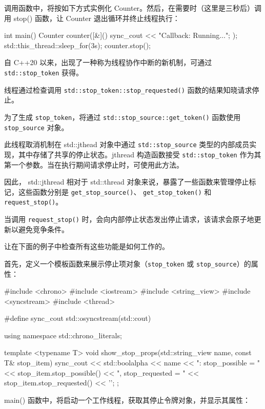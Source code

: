 调用函数中，将按如下方式实例化 Counter。然后，在需要时（这里是三秒后）调用 stop() 函数，让 Counter 退出循环并终止线程执行：

\begin{cpp}
int main() {
    Counter counter([&]() {
        sync_cout << "Callback: Running...\n";
    });
    std::this_thread::sleep_for(3s);
    counter.stop();
}
\end{cpp}

自 C++20 以来，出现了一种称为线程协作中断的新机制，可通过 \verb|std::stop_token| 获得。

线程通过检查调用 \verb|std::stop_token::stop_requested()| 函数的结果知晓请求停止。

为了生成 \verb|stop_token|，将通过 \verb|std::stop_source::get_token()| 函数使用 \verb|stop_source| 对象。

此线程取消机制在 std::jthead 对象中通过 \verb|std::stop_source| 类型的内部成员实现，其中存储了共享的停止状态。jthread 构造函数接受 \verb|std::stop_token| 作为其第一个参数。当在执行期间请求停止时，可使用此方法。

因此， std::jthread 相对于 std::thread 对象来说，暴露了一些函数来管理停止标记，这些函数分别是 \verb|get_stop_source()|、 \verb|get_stop_token()| 和 \verb|request_stop()|。

当调用 \verb|request_stop()| 时，会向内部停止状态发出停止请求，该请求会原子地更新以避免竞争条件。

让在下面的例子中检查所有这些功能是如何工作的。

首先，定义一个模板函数来展示停止项对象（\verb|stop_token| 或 \verb|stop_source|）的属性：

\begin{cpp}
#include <chrono>
#include <iostream>
#include <string_view>
#include <syncstream>
#include <thread>

#define sync_cout std::osyncstream(std::cout)

using namespace std::chrono_literals;

template <typename T>
void show_stop_props(std::string_view name,
                     const T& stop_item) {
    sync_cout << std::boolalpha
              << name
              << ": stop_possible = "
              << stop_item.stop_possible()
              << ", stop_requested = "
              << stop_item.stop_requested()
              << '\n';
};
\end{cpp}

main() 函数中，将启动一个工作线程，获取其停止令牌对象，并显示其属性：

